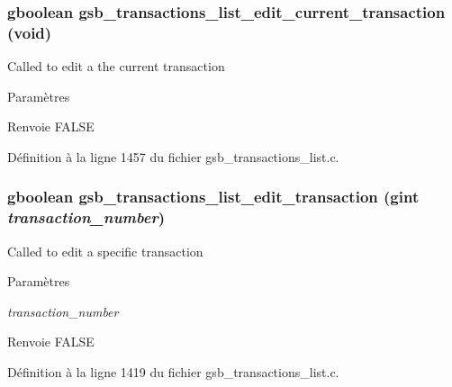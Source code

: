 \subsubsection[{gsb\_\-transactions\_\-list\_\-edit\_\-current\_\-transaction}]{\setlength{\rightskip}{0pt plus 5cm}gboolean gsb\_\-transactions\_\-list\_\-edit\_\-current\_\-transaction (void)}\label{gsb__transactions__list_8h_a78ae21515e884855e82af687571bb3c2}
Called to edit a the current transaction


\begin{DoxyParams}{Paramètres}
\item[{\em }]\end{DoxyParams}
\begin{DoxyReturn}{Renvoie}
FALSE 
\end{DoxyReturn}


Définition à la ligne 1457 du fichier gsb\_\-transactions\_\-list.c.

\subsubsection[{gsb\_\-transactions\_\-list\_\-edit\_\-transaction}]{\setlength{\rightskip}{0pt plus 5cm}gboolean gsb\_\-transactions\_\-list\_\-edit\_\-transaction (gint {\em transaction\_\-number})}\label{gsb__transactions__list_8h_a01ca41bdcf1f932ae3a4289433d64cf5}
Called to edit a specific transaction


\begin{DoxyParams}{Paramètres}
\item[{\em transaction\_\-number}]\end{DoxyParams}
\begin{DoxyReturn}{Renvoie}
FALSE 
\end{DoxyReturn}


Définition à la ligne 1419 du fichier gsb\_\-transactions\_\-list.c.

